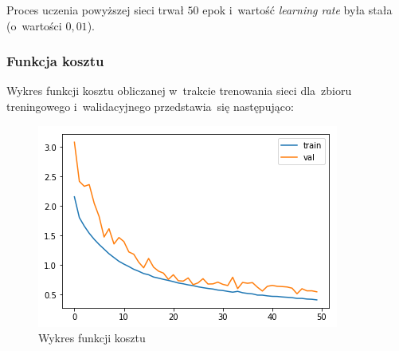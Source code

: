 \documentclass[11pt, a4paper]{article}
\begin{document}
Proces uczenia powyższej sieci trwał $50$ epok i~wartość \textit{learning rate} była stała (o~wartości $0,01$).

\subsubsection{Funkcja kosztu}
Wykres funkcji kosztu obliczanej w~trakcie trenowania sieci dla~zbioru treningowego i~walidacyjnego przedstawia~się następująco:
\begin{figure}[H]
\centering
    \includegraphics[scale=0.8]{funkcja_kosztu.png}
    \caption{Wykres funkcji kosztu}
\end{figure}
\end{document}

